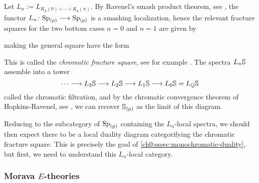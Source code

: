 Let $L_n := L_{K_p(0)\vee \cdots \vee K_p(n)}$. By Ravenel's smash product theorem, see \cite[7.5.6]{ravenel_92}, the functor $L_n\colon \sp_{(p)}\longrightarrow \sp_{(p)}$ is a smashing localization, hence the relevant fracture squares for the two bottom cases $n=0$ and $n=1$ are given by
\begin{center}
\end{center}
making the general square have the form
\begin{center}
\end{center}
This is called the \emph{chromatic fracture square}, see for example \cite[4.3]{hovey_95}. The spectra $L_n\S$ assemble into a tower 
$$\cdots \longrightarrow L_3\S \longrightarrow L_2\S \longrightarrow L_1\S \longrightarrow L_0 \S = L_\Q\S$$
called the chromatic filtration, and by the chromatic convergence theorem of Hopkins-Ravenel, see \cite[7.5.7]{ravenel_92}, we can recover $\S_{(p)}$ as the limit of this diagram. 


\begin{remark}
    \label{ch0:rm:chromatic-square-from-duality}
    Reducing to the subcategory of $\Sp_{(p)}$ containing the $L_n$-local spectra, we should then expect there to be a local duality diagram categorifying the chromatic fracture square. This is precisely the goal of \cref{ch0:sssec:monochromatic-duality}, but first, we need to understand this $L_n$-local category. 
\end{remark}







\subsubsection{Morava \texorpdfstring{$E$}{E}-theories}
\label{ch0:sssec:morava-E-theories}

